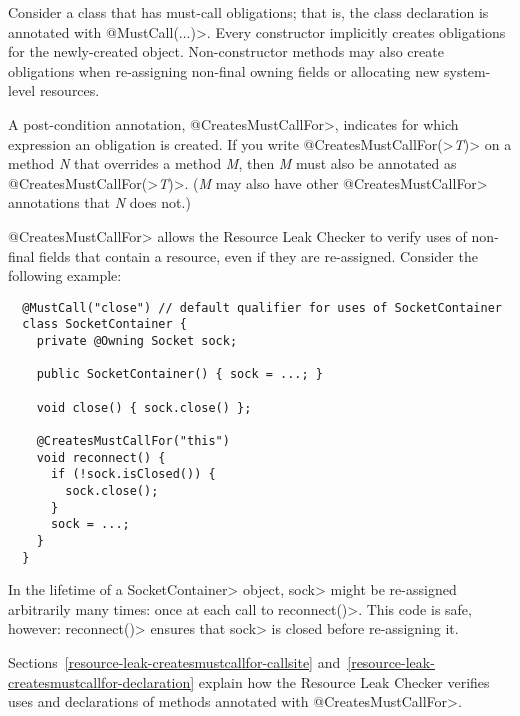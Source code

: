 
Consider a class that has must-call obligations; that is, the class
declaration is annotated with \<@MustCall(...)>.
Every constructor implicitly creates obligations for the newly-created object.
Non-constructor methods may also create obligations
when re-assigning non-final owning fields or allocating
new system-level resources.

A post-condition annotation,
\<@CreatesMustCallFor>,
indicates for which expression an obligation is created.
If you write \<@CreatesMustCallFor(>\emph{T}\<)> on a method \emph{N} that
overrides a method \emph{M}, then \emph{M} must also be annotated as
\<@CreatesMustCallFor(>\emph{T}\<)>.  (\emph{M} may also have other
\<@CreatesMustCallFor> annotations that \emph{N} does not.)

\<@CreatesMustCallFor> allows the Resource Leak Checker to verify uses of non-final fields
that contain a resource, even if they are re-assigned. Consider
the following example:

\begin{verbatim}
  @MustCall("close") // default qualifier for uses of SocketContainer
  class SocketContainer {
    private @Owning Socket sock;

    public SocketContainer() { sock = ...; }

    void close() { sock.close() };

    @CreatesMustCallFor("this")
    void reconnect() {
      if (!sock.isClosed()) {
        sock.close();
      }
      sock = ...;
    }
  }
\end{verbatim}

In the lifetime of a \<SocketContainer> object, \<sock>
might be re-assigned arbitrarily many times: once at each
call to \<reconnect()>. This code is safe, however: \<reconnect()>
ensures that \<sock> is closed before re-assigning it.

Sections~\ref{resource-leak-createsmustcallfor-callsite}
and~\ref{resource-leak-createsmustcallfor-declaration}
explain how the Resource Leak Checker verifies uses and declarations of
methods annotated with \<@CreatesMustCallFor>.



